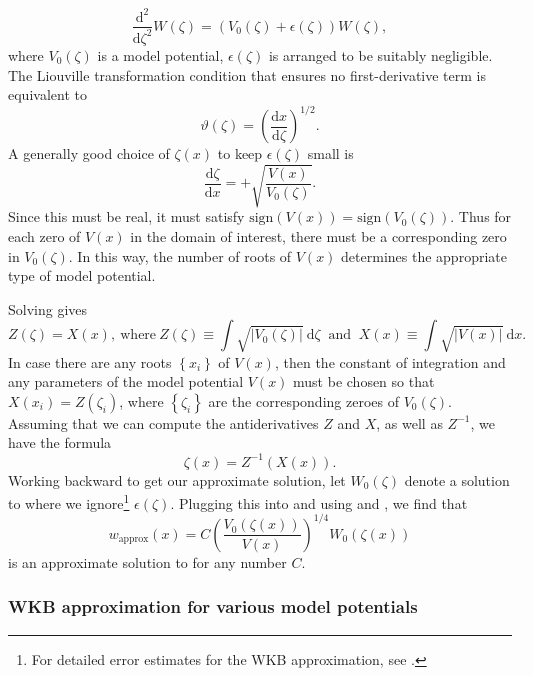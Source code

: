 \begin{equation}
\frac{\mathrm{d}^{2}}{\mathrm{d}\zeta^{2}}W(\zeta)=\left(V_{0}(\zeta)+\epsilon(\zeta)\right)W(\zeta),\label{eq:WKB-transformed}
\end{equation}
 where $V_{0}(\zeta)$ is a model potential, $\epsilon(\zeta)$ is arranged to be suitably negligible. The Liouville transformation condition that ensures no first-derivative term is equivalent to 
\begin{equation}
\vartheta(\zeta)=\left(\frac{\mathrm{d}x}{\mathrm{d}\zeta}\right)^{1/2}.\label{eq:WKB-mult}
\end{equation}
A generally good choice of $\zeta(x)$ to keep $\epsilon(\zeta)$ small is 
\begin{equation}
\frac{\mathrm{d}\zeta}{\mathrm{d}x}=+\sqrt{\frac{V(x)}{V_{0}(\zeta)}}.\label{eq:zeta-def}
\end{equation}
Since this must be real, it must satisfy $\mathrm{sign}(V(x))=\mathrm{sign}(V_{0}(\zeta))$. Thus for each zero of $V(x)$ in the domain of interest, there must be a corresponding zero in $V_{0}(\zeta)$. In this way, the number of roots of $V(x)$ determines the appropriate type of model potential.

Solving  gives 
\[
Z(\zeta)=X(x),\ \textrm{where}\ Z(\zeta)\equiv\int\sqrt{\left|V_{0}(\zeta)\right|}\ \mathrm{d}\zeta\ \textrm{ and }\ X(x)\equiv\int\sqrt{\left|V(x)\right|}\ \mathrm{d}x.
\]
In case there are any roots $\left\{ x_{i}\right\} $ of $V(x)$, then the constant of integration and any parameters of the model potential $V(x)$ must be chosen so that $X(x_{i})=Z(\zeta_{i})$, where $\left\{ \zeta_{i}\right\} $ are the corresponding zeroes of $V_{0}(\zeta)$.  Assuming that we can compute the antiderivatives $Z$ and $X$, as well as $Z^{-1}$, we have the formula 
\[
\zeta(x)=Z^{-1}\left(X(x)\right).
\]
 Working backward to get our approximate solution, let $W_{0}(\zeta)$ denote a solution to  where we ignore\footnote{For detailed error estimates for the WKB approximation, see \cite{olver1997}.} $\epsilon(\zeta)$. Plugging this into  and using  and , we find that 
\begin{equation}
w_{\textrm{approx}}(x)=C\left(\frac{V_{0}(\zeta(x))}{V(x)}\right)^{1/4}W_{0}(\zeta(x))\label{eq:WKB}
\end{equation}
 is an approximate solution to  for any number $C$.

\subsubsection{\label{subsec:WKB-formulas}WKB approximation for various model potentials}

